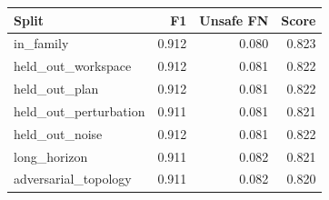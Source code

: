 \begin{tabular}{lrrr}
\toprule
Split & F1 & Unsafe FN & Score \\
\midrule
in\_family & 0.912 & 0.080 & 0.823 \\
held\_out\_workspace & 0.912 & 0.081 & 0.822 \\
held\_out\_plan & 0.912 & 0.081 & 0.822 \\
held\_out\_perturbation & 0.911 & 0.081 & 0.821 \\
held\_out\_noise & 0.912 & 0.081 & 0.822 \\
long\_horizon & 0.911 & 0.082 & 0.821 \\
adversarial\_topology & 0.911 & 0.082 & 0.820 \\
\bottomrule
\end{tabular}
